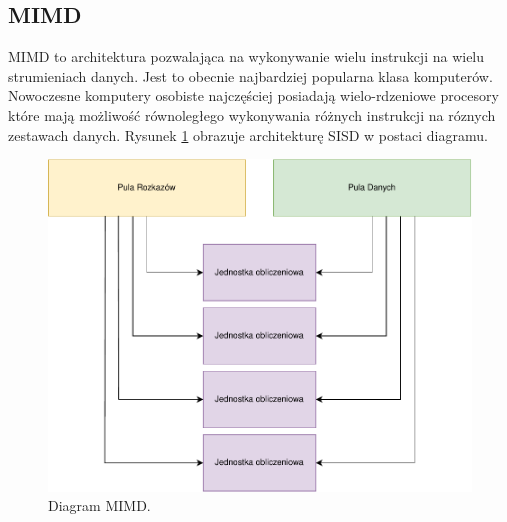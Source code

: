 \documentclass[a4paper,12pt]{book} %
\begin{document}
\subsection {MIMD}
MIMD to architektura pozwalająca na wykonywanie wielu instrukcji na wielu strumieniach danych. Jest to obecnie najbardziej popularna klasa komputerów. Nowoczesne komputery osobiste najczęściej posiadają wielo-rdzeniowe procesory które mają możliwość równoległego wykonywania różnych instrukcji na róznych zestawach danych. Rysunek \ref{fig:mimd} obrazuje architekturę SISD w postaci diagramu.
\begin{figure}
	\centering
	\includegraphics[scale=1]{assets/MIMD.pdf}
	\caption{Diagram MIMD.}
	\label{fig:mimd}
\end{figure}
\end{document}
